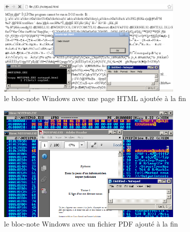 \begin{figure}[ht]
  \centering
  \includegraphics[width=0.8\textwidth]{albertini/img/htmlnotepad}
  \caption{le bloc-note Windows avec une page HTML ajoutée à la fin}
  \label{fig:albertini:pythonnotepad}
\end{figure}

\begin{figure}[ht]
  \centering
  \includegraphics[width=0.8\textwidth]{albertini/img/pdfnotepad}
  \caption{le bloc-note Windows avec un fichier PDF ajouté à la fin}
  \label{fig:albertini:pythonnotepad}
\end{figure}



